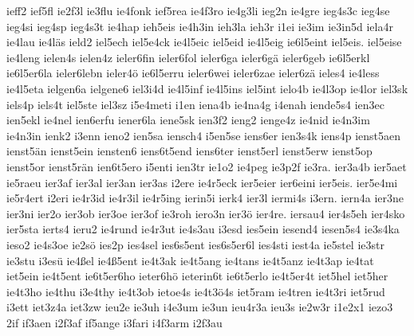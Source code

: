 {    ieff2
    ief5fl
    ie2f3l
    ie3flu
    ie4fonk
    ief5rea
    ie4f3ro
    ie4g3li
    ieg2n
    ie4gre
    ieg4s3c
    ieg4se
    ieg4si
    ieg4sp
    ieg4s3t
    ie4hap
    ieh5eis
    ie4h3in
    ieh3la
    ieh3r
    i1ei
    ie3im
    ie3in5d
    iela4r
    ie4lau
    ie4läs
    ield2
    iel5ech
    iel5e4ck
    ie4l5eic
    iel5eid
    ie4l5eig
    ie6l5eint
    iel5eis.
    iel5eise
    ie4leng
    ielen4s
    ielen4z
    ieler6fin
    ieler6fol
    ieler6ga
    ieler6gä
    ieler6geb
    ie6l5erkl
    ie6l5er6la
    ieler6lebn
    ieler4ö
    ie6l5erru
    ieler6wei
    ieler6zae
    ieler6zä
    ieles4
    ie4less
    ie4l5eta
    ielgen6a
    ielgene6
    iel3i4d
    ie4l5inf
    ie4l5ins
    iel5int
    ielo4b
    ie4l3op
    ie4lor
    iel3sk
    iels4p
    iels4t
    iel5ste
    iel3sz
    i5e4meti
    i1en
    iena4b
    ie4na4g
    i4enah
    iende5s4
    ien3ec
    ien5ekl
    ie4nel
    ien6erfu
    iener6la
    iene5sk
    ien3f2
    ieng2
    ienge4z
    ie4nid
    ie4n3im
    ie4n3in
    ienk2
    i3enn
    ieno2
    ien5sa
    iensch4
    i5en5se
    iens6er
    ien3s4k
    iens4p
    ienst5aen
    ienst5än
    ienst5ein
    iensten6
    iens6t5end
    iens6ter
    ienst5erl
    ienst5erw
    ienst5op
    ienst5or
    ienst5rän
    ien6t5ero
    i5enti
    ien3tr
    ie1o2
    ie4peg
    ie3p2f
    ie3ra.
    ier3a4b
    ier5aet
    ie5raeu
    ier3af
    ier3al
    ier3an
    ier3as
    i2ere
    ie4r5eck
    ier5eier
    ier6eini
    ier5eis.
    ier5e4mi
    ie5r4ert
    i2eri
    ie4r3id
    ie4r3il
    ie4r5ing
    ierin5i
    ierk4
    ier3l
    iermi4s
    i3ern.
    iern4a
    ier3ne
    ier3ni
    ier2o
    ier3ob
    ier3oe
    ier3of
    ie3roh
    iero3n
    ier3ö
    ier4re.
    iersau4
    ier4s5eh
    ier4sko
    ier5sta
    ierts4
    ieru2
    ie4rund
    ie4r3ut
    ie4s3au
    i3esd
    ies5ein
    iesend4
    iesen5s4
    ie3s4ka
    ieso2
    ie4s3oe
    ie2sö
    ies2p
    ies4sel
    ies6s5ent
    ies6s5er6l
    ies4sti
    iest4a
    ie5stel
    ie3str
    ie3stu
    i3esü
    ie4ßel
    ie4ß5ent
    ie4t3ak
    ie4t5ang
    ie4tans
    ie4t5anz
    ie4t3ap
    ie4tat
    iet5ein
    ie4t5ent
    ie6t5er6ho
    ieter6hö
    ieterin6t
    ie6t5erlo
    ie4t5er4t
    iet5hel
    iet5her
    ie4t3ho
    ie4thu
    i3e4thy
    ie4t3ob
    ietoe4s
    ie4t3ö4s
    iet5ram
    ie4tren
    ie4t3ri
    iet5rud
    i3ett
    iet3z4a
    iet3zw
    ieu2e
    ie3uh
    i4e3um
    ie3un
    ieu4r3a
    ieu3s
    ie2w3r
    i1e2x1
    iezo3
    2if
    if3aen
    i2f3af
    if5ange
    i3fari
    i4f3arm
    i2f3au
}
